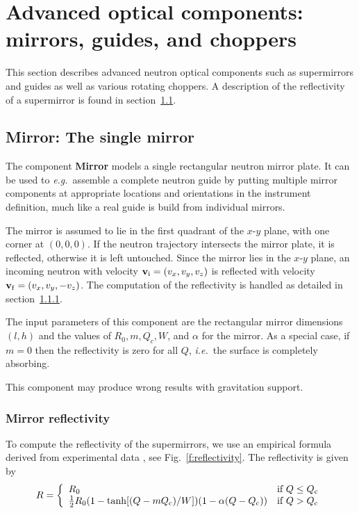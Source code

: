
\chapter{Advanced optical components: mirrors, guides, and choppers}

This section describes advanced neutron optical
components such as supermirrors and guides as well as various rotating choppers.
A description of the reflectivity of a supermirror is found 
in section~\ref{s:mirror}.

\section{Mirror: The single mirror}
\label{s:mirror}

The component {\bf Mirror}
models a single rectangular neutron mirror plate. It can
be used to \textit{e.g.}~assemble a complete neutron guide by putting multiple
mirror components at appropriate locations and orientations in the
instrument definition, much like a real guide is build from individual
mirrors.

The mirror is assumed to lie in the first quadrant of the
$x$-$y$ plane, with one corner at $(0,0,0)$.
If the neutron trajectory intersects the mirror plate, it is
reflected, otherwise it is left untouched. Since the mirror lies in the
$x$-$y$ plane, an incoming neutron with velocity
${\bf v}_{\rm i} = (v_x,v_y,v_z)$
is reflected with velocity ${\bf v}_{\rm f} = (v_x,v_y,-v_z)$.
The computation of the reflectivity is handled as detailed in
section~\ref{ss:mirrorreflect}.

The input parameters of this component are
the rectangular mirror dimensions $(l, h)$
and the values of $R_0, m, Q_c, W$, and $\alpha$ for the mirror.
As a special case, if $m=0$ then the reflectivity is zero for all $Q$,
\textit{i.e.}\ the surface is completely absorbing.

This component may produce wrong results with gravitation support.

\subsection{Mirror reflectivity}
\label{ss:mirrorreflect}
To compute the reflectivity of the supermirrors, we use an empirical
formula derived from experimental data \cite{pb_241_50}, 
see Fig.~\ref{f:reflectivity}. The reflectivity is given by 
\begin{equation} \label{e:Rmirror}
  R = \left\{
    \begin{array}{ll}
      R_0 & \textrm{if $Q \leq Q_{\rm c}$} \\
      \frac{1}{2}R_0(1 - \tanh[(Q - m Q_{\rm c})/W])(1-\alpha(Q-Q_{\rm c}))
         & \textrm{if $Q > Q_{\rm c}$}
    \end{array}
  \right.
\end{equation}

